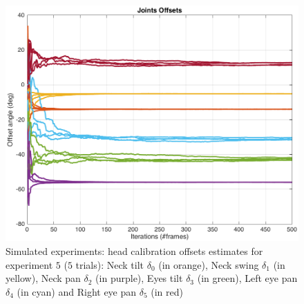 \begin{figure}
\includegraphics[width=0.975\columnwidth]{images/results/calibration_sim_exp_5}
\caption{Simulated experiments: head calibration offsets estimates for experiment $5$ ($5$ trials): Neck tilt $\delta_0$ (in orange), Neck swing $\delta_1$ (in yellow), Neck pan $\delta_2$ (in purple), Eyes tilt $\delta_3$ (in green), Left eye pan $\delta_4$ (in cyan) and Right eye pan $\delta_5$ (in red)}
\label{fig:head_offsets_convergence}
\end{figure}

